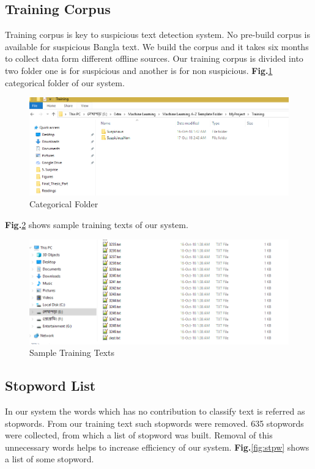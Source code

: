 \documentclass[12pt,a4paper]{report}
\begin{document}
\subsection{Training Corpus}
Training corpus is key to suspicious text detection system. No pre-build corpus is available for suspicious Bangla text. We build the corpus and it takes six months to collect data form different offline sources. Our training corpus is divided into two folder one is for suspicious and another is for non suspicious. \textbf{Fig.}\ref{fig:CAP} categorical folder of our system.
\begin{figure}[h!]
    \centering
    \includegraphics[scale=0.6]{Figures/categorical_fld.PNG}
    \caption{Categorical Folder}
    \label{fig:CAP}
\end{figure}
\par\noindent
\vspace{0.5cm}
\textbf{Fig.}\ref{fig:SMT} shows sample training texts of our system.
\begin{figure}[h!]
    \centering
    \includegraphics[scale=0.6]{Figures/sample_train.PNG}
    \caption{Sample Training Texts}
    \label{fig:SMT}
\end{figure}
\subsection{Stopword List}
In our system the words which has no contribution to classify text is referred as stopwords. From our training text such stopwords were removed. 635 stopwords were collected, from which a list of stopword was built. Removal of this unnecessary words helps to increase efficiency of our system.
\textbf{Fig.}\ref{fig:stpw} shows a list of some stopword.
\end{document}
